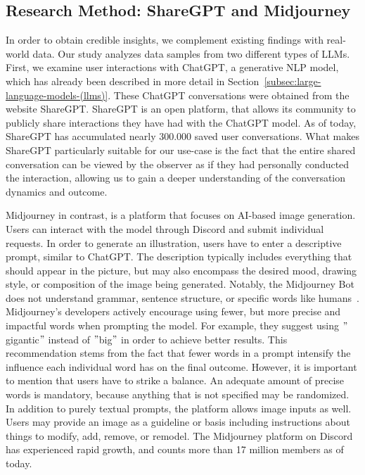 \subsection{Research Method: ShareGPT and Midjourney}
\label{subsec:research-method:-sharegpt-and-midjourney}
In order to obtain credible insights, we complement existing findings with real-world data.
Our study analyzes data samples from two different types of
LLMs.
First, we examine user interactions with ChatGPT, a generative NLP model, which has already been
described in more detail in Section~\ref{subsec:large-language-models-(llms)}.
These ChatGPT conversations were obtained from the website ShareGPT\cite{sharegpt_sharegpt_2023}.
ShareGPT is an open platform, that allows its community to publicly share interactions they have
had with the ChatGPT model.
As of today, ShareGPT has accumulated nearly 300.000 saved user conversations.
What makes ShareGPT particularly suitable for our use-case is the fact that the entire shared conversation
can be viewed by the observer as if they had personally conducted the interaction, allowing us to
gain a deeper understanding of the conversation dynamics and outcome.
\newline

Midjourney in contrast, is a platform that focuses on AI-based image generation.
Users can interact with the model through Discord\cite{} and submit individual requests. %
In order to generate an illustration, users have to enter a descriptive prompt, similar to
ChatGPT\@.
The description typically includes everything that should appear in the picture, but may also
encompass the desired mood, drawing style, or composition of the image being generated.
Notably, the Midjourney Bot does not understand grammar, sentence structure, or specific words like
humans~\cite{}. %
Midjourney's developers actively encourage using fewer, but more precise and impactful words when
prompting
the model.
For example, they suggest using \("\)gigantic\("\) instead of \("\)big\("\) in order to achieve
better results. %
This recommendation stems from the fact that fewer words in a prompt intensify the influence each
individual word has on the final outcome.
However, it is important to mention that users have to strike a balance.
An adequate amount of precise words is mandatory, because anything that is not specified may be
randomized.
In addition to purely textual prompts, the platform allows image inputs as well.
Users may provide an image as a guideline or basis including instructions about things to modify,
add, remove, or remodel.
The Midjourney platform on Discord has experienced rapid growth, and counts more than 17 million
members as of today.
\newline

